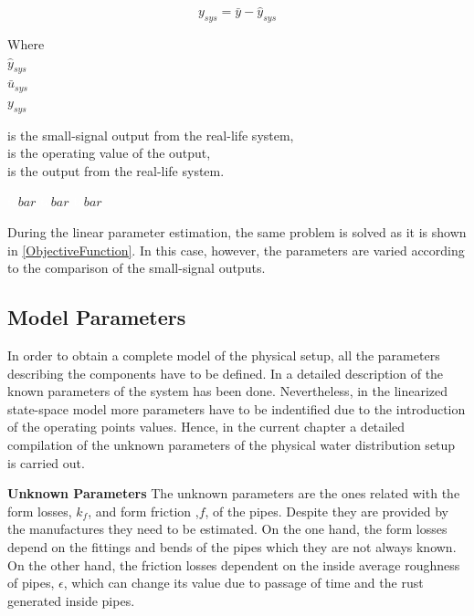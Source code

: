 \begin{equation}
  y_{sys} = \bar{y} - \hat{y}_{sys} 
 \label{u_smallsignal}
\end{equation}

\begin{minipage}[t]{0.20\textwidth}
Where\\
\hspace*{8mm} $\hat{y}_{sys}$ \\
\hspace*{8mm} $\bar{u}_{sys}$ \\
\hspace*{8mm} $y_{sys}$ 
\end{minipage}
\begin{minipage}[t]{0.68\textwidth}
\vspace*{2mm}
is the small-signal output from the real-life system, \\
is the operating value of the output,\\
is the output from the real-life system. 
\end{minipage}
\begin{minipage}[t]{0.10\textwidth}
\vspace*{2mm}
\textcolor{White}{te}$\unit{bar}$
\textcolor{White}{te}$\unit{bar}$
\textcolor{White}{te}$\unit{bar}$
\end{minipage} 

During the linear parameter estimation, the same problem is solved as it is shown in \eqref{ObjectiveFunction}. In this case, however, the parameters are varied according to the comparison of the small-signal outputs.  

\subsection{Model Parameters}
\label{estimateParameters}
In order to obtain a complete model of the physical setup, all the parameters describing the components have to be defined. In  a detailed
description of the known parameters of the system has been done. Nevertheless, in the linearized state-space model more parameters have to be indentified
due to the introduction of the operating points values. Hence, in the current chapter a detailed compilation of the unknown parameters of the physical water distribution setup is carried out.


\textbf{Unknown Parameters}
The unknown parameters are the ones related with the form losses, $k_f$, and form friction ,$f$, of the pipes. Despite they are 
provided by the manufactures they need to be estimated. On the one hand, the form losses depend on the fittings and bends of the pipes which they are not always known. 
On the other hand, the friction losses dependent on the inside average roughness of pipes, $\epsilon$, which can change its value due to passage of time 
and the rust generated inside pipes. 

